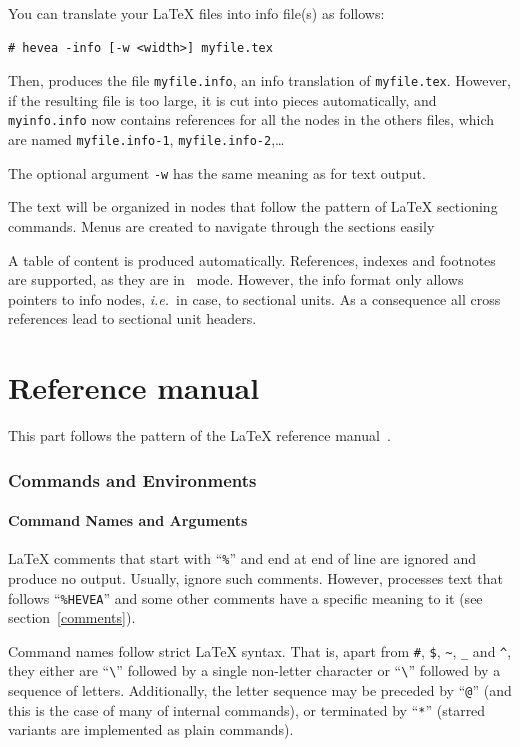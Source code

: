 You can translate your \LaTeX{} files into info file(s) as follows:
\begin{verbatim}
# hevea -info [-w <width>] myfile.tex
\end{verbatim}
Then, \hevea{} produces the file \texttt{myfile.info}, an info
translation of \texttt{myfile.tex}.
However, if the resulting  file is too large, it is cut into pieces
automatically,
and \texttt{myinfo.info} now contains references for all
the nodes in the others files, which are named \texttt{myfile.info-1},
\texttt{myfile.info-2},\ldots

The optional argument \verb+-w+ has the same meaning as for text output.

The text will be organized in nodes that follow
the pattern of \LaTeX{} sectioning
commands. Menus are created to navigate through the sections easily

A table of content is produced automatically.
References, indexes and footnotes are supported, as they are in
\html{}~mode.
However, the info format only allows pointers to info nodes,
\emph{i.e.}\ in \hevea{} case, to sectional units.
As a consequence all cross references lead to sectional unit headers.


\setcounter{section}{0}
\renewcommand{\thesection}{\thepart.\arabic{section}}
\cutend

\part{Reference manual}
\label{referencemanual}
This part follows the pattern of the \LaTeX{} reference
manual~\cite[Appendix~C]{latex}.

\section{Commands and Environments}

\subsection{Command Names and Arguments}

\LaTeX{} comments that start with ``\verb+%+'' %
and end at end of line are ignored and produce no output.
Usually, \hevea{} ignore such comments. However, \hevea{} processes
text that follows ``\verb+%HEVEA+'' %
and some other comments have a specific meaning to it (see
section~\ref{comments}).

Command names follow strict \LaTeX{} syntax. That is, apart from
\verb+#+, \verb+$+, %
\verb+~+, \verb+_+ and \verb+^+, they either are
``\verb+\+'' followed by a single non-letter character or
``\verb+\+'' followed by a sequence of letters.
Additionally, the letter sequence may be preceded by ``\verb+@+''
(and this is the case of many of \hevea{} internal commands), or
terminated by ``\verb+*+'' (starred variants are implemented as plain
commands).

